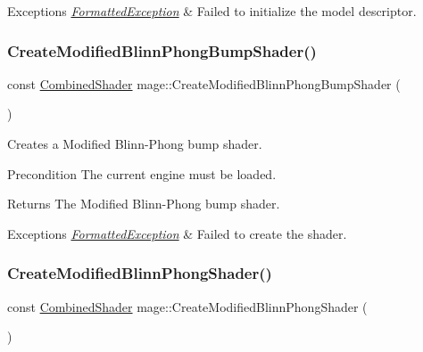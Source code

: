 \begin{DoxyExceptions}{Exceptions}
{\em \hyperlink{structmage_1_1_formatted_exception}{Formatted\+Exception}} & Failed to initialize the model descriptor. \\
\hline
\end{DoxyExceptions}
\hypertarget{namespacemage_a635e04f055519d9b888c5ab7cfc742a1}{}\label{namespacemage_a635e04f055519d9b888c5ab7cfc742a1} 
\subsubsection{\texorpdfstring{Create\+Modified\+Blinn\+Phong\+Bump\+Shader()}{CreateModifiedBlinnPhongBumpShader()}}
{\footnotesize\ttfamily const \hyperlink{structmage_1_1_combined_shader}{Combined\+Shader} mage\+::\+Create\+Modified\+Blinn\+Phong\+Bump\+Shader (\begin{DoxyParamCaption}{ }\end{DoxyParamCaption})}

Creates a Modified Blinn-\/\+Phong bump shader.

\begin{DoxyPrecond}{Precondition}
The current engine must be loaded. 
\end{DoxyPrecond}
\begin{DoxyReturn}{Returns}
The Modified Blinn-\/\+Phong bump shader. 
\end{DoxyReturn}

\begin{DoxyExceptions}{Exceptions}
{\em \hyperlink{structmage_1_1_formatted_exception}{Formatted\+Exception}} & Failed to create the shader. \\
\hline
\end{DoxyExceptions}
\hypertarget{namespacemage_a76c5e80b2777a1600d7fd6e184be892a}{}\label{namespacemage_a76c5e80b2777a1600d7fd6e184be892a} 
\subsubsection{\texorpdfstring{Create\+Modified\+Blinn\+Phong\+Shader()}{CreateModifiedBlinnPhongShader()}}
{\footnotesize\ttfamily const \hyperlink{structmage_1_1_combined_shader}{Combined\+Shader} mage\+::\+Create\+Modified\+Blinn\+Phong\+Shader (\begin{DoxyParamCaption}{ }\end{DoxyParamCaption})}

